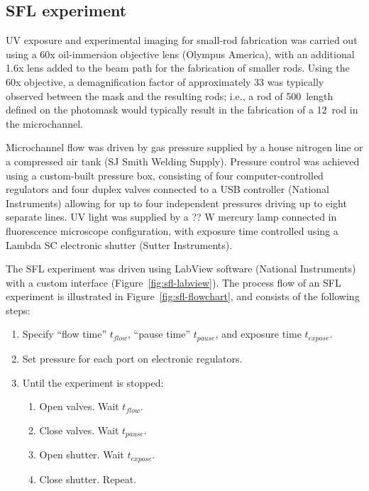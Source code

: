 \subsection{SFL experiment}
UV exposure and experimental imaging for small-rod fabrication was carried out using a 60x 
oil-immersion objective lens (Olympus America), with an additional 1.6x lens added to the beam path for
the fabrication of smaller rods.  Using the 60x objective, a demagnification factor of approximately 
33 was typically observed between the mask and the resulting rods; i.e., a rod of 500~\microns length defined on
the photomask would typically result in the fabrication of a 12~\microns rod in the microchannel.

Microchannel flow was driven by gas pressure supplied by a house nitrogen line or a compressed air tank 
(SJ Smith Welding Supply). Pressure control was achieved using a custom-built pressure box, consisting of
four computer-controlled regulators and four duplex valves connected to a USB
controller (National Instruments) allowing for 
up to four independent pressures driving up to eight separate lines. UV light was supplied by a ?? W mercury lamp
connected in fluorescence microscope configuration, with exposure time controlled using a Lambda SC 
electronic shutter (Sutter Instruments).

The SFL experiment was driven using LabView software (National Instruments) with a custom
interface (Figure~\ref{fig:sfl-labview}). The process
flow of an SFL experiment is illustrated in Figure~\ref{fig:sfl-flowchart}, and consists of the following steps:

\begin{enumerate}
\item Specify ``flow time'' $t_{flow}$, ``pause time'' $t_{pause}$, and exposure time $t_{expose}$.
\item Set pressure for each port on electronic regulators.
\item Until the experiment is stopped:
\begin{enumerate}
\item Open valves. Wait $t_{flow}$.
\item Close valves. Wait $t_{pause}$.
\item Open shutter. Wait $t_{expose}$.
\item Close shutter. Repeat.
\end{enumerate}
\end{enumerate}

